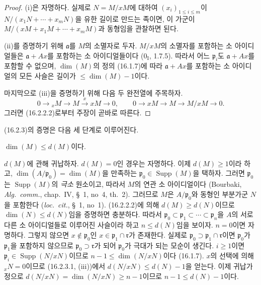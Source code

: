 \begin{proof}
(i)은 자명하다. 실제로 $N=M/xM$에 대하여
$(x_i)_{1\leq i\leq m}$이
$N/(x_1N+\cdots+x_mN)$을 유한 길이로 만드는 족이면, 이 가군이
$M/(xM+x_1M+\cdots+x_mM)$과 동형임을 관찰하면 된다.

(ii)를 증명하기 위해 $\mathfrak{a}$를 $M$의 소멸자로 두자.
$M/xM$의 소멸자를 포함하는 소 아이디얼들은
$\mathfrak{a}+Ax$를 포함하는 소 아이디얼들이다
($0_{\mathrm I}$, 1.7.5). 따라서 어느 $\mathfrak{p}_i$도
$\mathfrak{a}+Ax$를 포함할 수 없으며, $\dim(M)$의 정의 (16.1.7)에
따라 $\mathfrak{a}+Ax$를 포함하는 소 아이디얼의 모든 사슬은 길이가
$\leq\dim(M)-1$이다.


마지막으로 (iii)을 증명하기 위해 다음 두 완전열에 주목하자.
\[
  0\to{}_xM\to M\xrightarrow{x}xM\to0,\qquad
  0\to xM\to M\to M/xM\to0.
\]
그러면 (16.2.2.2)로부터 주장이 곧바로 따른다.
\end{proof}

(16.2.3)의 증명은 다음 세 단계로 이루어진다.

\begin{env}[16.2.3.2]
\label{0.16.2.3.2-fr}
$\dim(M)\leq d(M)$이다.
\end{env}

$d(M)$에 관해 귀납하자. $d(M)=0$인 경우는 자명하다. 이제
$d(M)\geq1$이라 하고,
$\dim(A/\mathfrak{p}_0)=\dim(M)$을 만족하는
$\mathfrak{p}_0\in\operatorname{Supp}(M)$을 택하자. 그러면
$\mathfrak{p}_0$는 $\operatorname{Supp}(M)$의 \emph{극소} 원소이고,
따라서 $M$의 연관 소 아이디얼이다 (Bourbaki,
\emph{Alg.~comm.}, chap.~IV, \S~1, no~4, th.~2). 그러므로 $M$은
$A/\mathfrak{p}_0$와 동형인 부분가군 $N$을 포함한다
(\emph{loc.~cit.}, \S~1, no~1). (16.2.2.2)에 의해
$d(M)\geq d(N)$이므로 $\dim(N)\leq d(N)$임을 증명하면 충분하다.
따라서
$\mathfrak{p}_0\subset\mathfrak{p}_1\subset\cdots
\subset\mathfrak{p}_n$을 $A$의 서로 다른 소 아이디얼들로 이루어진
사슬이라 하고
$n\leq d(N)$임을 보이자. $n=0$이면 자명하다. 그렇지 않으면
$x\notin\mathfrak{p}_0$인
$x\in\mathfrak{p}_1\cap\mathfrak{r}$가 존재한다. 실제로
$\mathfrak{p}_0\supset\mathfrak{p}_1\cap\mathfrak{r}$이면
$\mathfrak{p}_0$가 $\mathfrak{p}_1$을 포함하지 않으므로
$\mathfrak{p}_0\supset\mathfrak{r}$가 되어 $\mathfrak{p}_0$가
극대가 되는 모순이 생긴다. $i\geq1$이면
$\mathfrak{p}_i\in\operatorname{Supp}(N/xN)$이므로
$n-1\leq\dim(N/xN)$이다 (16.1.7). $x$의 선택에 의해
${}_xN=0$이므로 (16.2.3.1, (iii))에서
$d(N/xN)\leq d(N)-1$을 얻는다. 이제 귀납가정으로
$d(N/xN)=\dim(N/xN)\geq n-1$이므로
$n-1\leq d(N)-1$이다.

